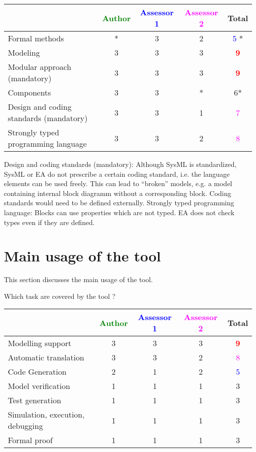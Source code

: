 \begin{tabular}{|l | c | c | c | c|}
\hline
& \textcolor{green}{Author} & \textcolor{blue}{Assessor 1} & \textcolor{magenta}{Assessor 2} & Total \\
\hline
Formal methods  &* & 3    &  2& \textcolor{blue}{5} * \\
\hline 
Modeling  &3 & 3    & 3     &  \textcolor{red}{\textbf{9}} \\
\hline
Modular approach (mandatory) &3 & 3    & 3    & \textcolor{red}{\textbf{9}} \\
\hline
Components &3 & 3    & * &  6* \\
\hline
Design and coding standards (mandatory) &3 & 3    & 1    & \textcolor{magenta}{7} \\
\hline
Strongly typed programming language &3 & 3    & 2     & \textcolor{magenta}{8}  \\
\hline

\end{tabular}

\begin{assessor2}
Design and coding standards (mandatory): Although SysML is standardized, SysML or EA do not prescribe a certain coding standard, i.e. the language elements can be used freely. This can lead to "`broken"' models, e.g. a model containing internal block diagramm without a corresponding block. Coding standards would need to be defined externally.
Strongly typed programming language: Blocks can use properties which are not typed. EA does not check types even if they are defined.
\end{assessor2}


\section{Main usage of the tool}
\label{main_usage}

This section discusses the main usage of the tool.

Which task are covered by the tool ?


\begin{tabular}{|l | c | c | c | c|}
\hline
& \textcolor{green}{Author} & \textcolor{blue}{Assessor 1} & \textcolor{magenta}{Assessor 2} & Total \\
\hline 
Modelling support &3 & 3    & 3    & \textcolor{red}{\textbf{9}} \\
\hline
Automatic translation  &3 & 3    & 2    & \textcolor{magenta}{8} \\
\hline
Code Generation  &2 & 1    & 2    & \textcolor{blue}{5} \\
\hline
Model verification &1 & 1    & 1    & 3     \\
\hline
Test generation &1 & 1    & 1    & 3     \\
\hline
Simulation, execution, debugging &1 & 1    & 1    & 3     \\
\hline
Formal proof &1 & 1    & 1    & 3     \\
\hline
\end{tabular}

